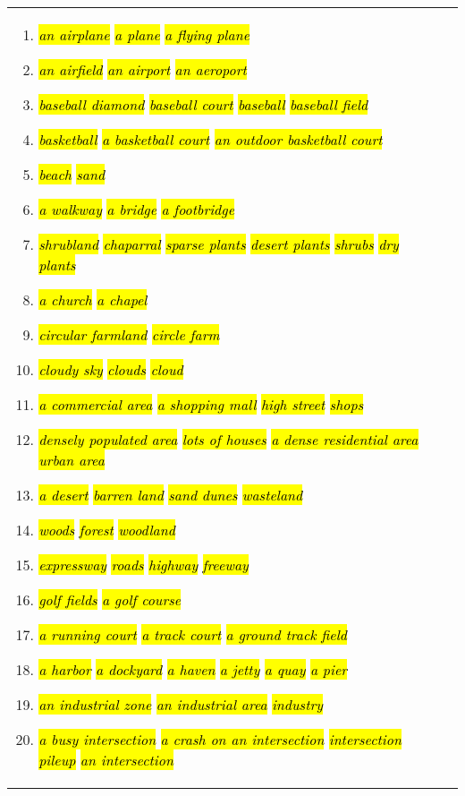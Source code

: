 \documentclass[10pt,twocolumn,letterpaper]{article}
\DeclareRobustCommand{\hlgrey}[1]{{\sethlcolor{light_gray}\hl{#1}}}
\newcommand{\clsfmt}[1]{\hlgrey{\textit{#1}}}
\begin{document}
\begin{longtable}[h]{p{}p{}p{}}
\small
\begin{enumerate}[itemsep=1pt,topsep=1pt,leftmargin=12pt]
	\item \clsfmt{an airplane}  \clsfmt{  a plane}  \clsfmt{  a flying plane}
	\item \clsfmt{an airfield}  \clsfmt{  an airport}  \clsfmt{  an aeroport}
	\item \clsfmt{baseball diamond}  \clsfmt{  baseball court}  \clsfmt{  baseball}  \clsfmt{  baseball field}
	\item \clsfmt{basketball}  \clsfmt{  a basketball court}  \clsfmt{  an outdoor basketball court}
	\item \clsfmt{beach}  \clsfmt{  sand}
	\item \clsfmt{a walkway}  \clsfmt{  a bridge}  \clsfmt{  a footbridge}
	\item \clsfmt{shrubland}  \clsfmt{  chaparral}  \clsfmt{  sparse plants}  \clsfmt{  desert plants}  \clsfmt{  shrubs}  \clsfmt{  dry plants}
	\item \clsfmt{a church}  \clsfmt{  a chapel}
	\item \clsfmt{circular farmland}  \clsfmt{  circle farm}
	\item \clsfmt{cloudy sky}  \clsfmt{  clouds}  \clsfmt{  cloud}
	\item \clsfmt{a commercial area}  \clsfmt{  a shopping mall}  \clsfmt{  high street}  \clsfmt{  shops}
	\item \clsfmt{densely populated area}  \clsfmt{  lots of houses}  \clsfmt{  a dense residential area}  \clsfmt{ urban area}
	\item \clsfmt{a desert}  \clsfmt{  barren land}  \clsfmt{  sand dunes}  \clsfmt{  wasteland}
	\item \clsfmt{woods}  \clsfmt{  forest}  \clsfmt{  woodland}
	\item \clsfmt{expressway}  \clsfmt{  roads}  \clsfmt{  highway}  \clsfmt{  freeway}
	\item \clsfmt{golf fields}  \clsfmt{  a golf course}
	\item \clsfmt{a running court}  \clsfmt{  a track court}  \clsfmt{  a ground track field}
	\item \clsfmt{a harbor}  \clsfmt{  a dockyard}  \clsfmt{  a haven}  \clsfmt{  a jetty}  \clsfmt{  a quay}  \clsfmt{  a pier}
	\item \clsfmt{an industrial zone}  \clsfmt{  an industrial area}  \clsfmt{  industry}
	\item \clsfmt{a busy intersection}  \clsfmt{  a crash on an intersection}  \clsfmt{  intersection pileup}  \clsfmt{ an intersection}

\end{enumerate}
\end{longtable}
\end{document}
